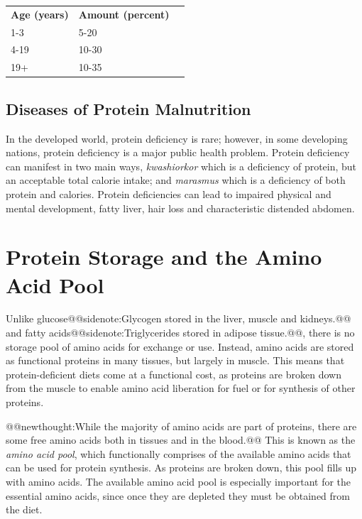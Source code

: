 \documentclass{tufte-handout}
\makeatletter
\def\newthought#1{@@newthought:#1@@}
\def\sidenote#1{@@sidenote:#1@@}
\makeatother
\begin{document}
\begin{margintable}
\centering
\caption{ Acceptable Macronutrient Distribution Range (AMDR) for protein intake over the lifespan in percent of calories (from \citep{USDA2015}).}
\label{tab:protein-amdr}
\begin{tabular}{lll}
\hline
\textbf {Age (years)} & \textbf{Amount (percent)}\\
1-3 & 5-20\\
4-19 & 10-30\\
19+ & 10-35\\
\hline

\hline
\end{tabular}
\end{margintable}

\subsection{Diseases of Protein Malnutrition}

In the developed world, protein deficiency is rare; however, in some developing nations, protein deficiency is a major public health problem.  Protein deficiency can manifest in two main ways, \emph{kwashiorkor} which is a deficiency of protein, but an acceptable total calorie intake; and \emph{marasmus} which is a deficiency of both protein and calories.  Protein deficiencies can lead to impaired physical and mental development, fatty liver, hair loss and characteristic distended abdomen.

\section{Protein Storage and the Amino Acid Pool}

Unlike glucose\sidenote{Glycogen stored in the liver, muscle and kidneys.} and fatty acids\sidenote{Triglycerides stored in adipose tissue.}, there is no storage pool of amino acids for exchange or use.  Instead, amino acids are stored as functional proteins in many tissues, but largely in muscle.  This means that protein-deficient diets come at a functional cost, as proteins are broken down from the muscle to enable amino acid liberation for fuel or for synthesis of other proteins.

\newthought{While the majority of amino acids are part of proteins, there are some free amino acids both in tissues and in the blood.}  This is known as the \emph{amino acid pool}, which functionally comprises of the available amino acids that can be used for protein synthesis.  As proteins are broken down, this pool fills up with amino acids.  The available amino acid pool is especially important for the essential amino acids, since once they are depleted they must be obtained from the diet.
\end{document}

